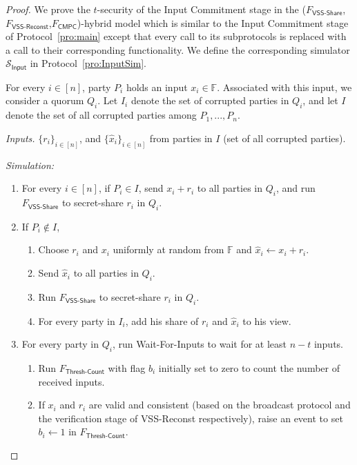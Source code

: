 \documentclass[11pt,letter]{article}
\newcommand{\alg}[1]{\mbox{\textsf{#1}}}
\newcommand{\func}[1]{\mbox{$F_\textsf{#1}$}}
\newcommand{\simu}[1]{\mbox{$\mathcal{S}_\textsf{#1}$}}
\newcommand{\mask}[1]{\widehat{#1}}
\newcommand{\F}{\mathbb{F}}
\theoremstyle{mytheoremstyle}
\let\savedCaption=\caption
\renewcommand*{\caption}[1]{\savedCaption[#1]{~#1}}
\newcommand{\algfont}{}
\begin{document}
\begin{proof}
	We prove the $t$-security of the Input Commitment stage in the (\func{VSS-Share}, \func{VSS-Reconst},\func{CMPC})-hybrid model which is similar to the Input Commitment stage of Protocol~\ref{pro:main} except that every call to its subprotocols is replaced with a call to their corresponding functionality. We define the corresponding simulator \simu{Input} in Protocol~\ref{pro:InputSim}.

	\begin{algorithm}
		\algfont
		\caption{\simu{Input}}
		\label{pro:InputSim}
		
		For every $i \in [n]$, party $P_i$ holds an input $x_i \in \F$. Associated with this input, we consider a quorum $Q_i$. Let $I_i$ denote the set of corrupted parties in $Q_i$, and let $I$ denote the set of all corrupted parties among $P_1,...,P_n$.\medskip
		
		\textit{Inputs.} $\{r_i\}_{i\in [n]}$, and $\{\mask{x}_i\} _{i \in [n]}$ from parties in $I$ (set of all corrupted parties). \medskip
		
		\textit{Simulation:}
		
		\begin{enumerate}
				\item For every $i \in [n]$, if $P_i \in I$, send $x_i + r_i$ to all parties in $Q_i$, and run \func{VSS-Share} to secret-share $r_i$ in $Q_i$.
				
				\item If $P_i \notin I$, 
					\begin{enumerate}
						\item Choose $r_i$ and $x_i$ uniformly at random from $\F$ and \mbox{$\mask{x}_i \gets x_i + r_i$}.
						\item Send $\mask{x}_i$ to all parties in $Q_i$.
						\item Run \func{VSS-Share} to secret-share $r_i$ in $Q_i$. 
						\item For every party in $I_i$, add his share of $r_i$ and $\mask{x}_i$ to his view.
					\end{enumerate}
			
				\item For every party in $Q_i$, run \alg{Wait-For-Inputs} to wait for at least $n-t$ inputs.
				\begin{enumerate}
					\item Run \func{Thresh-Count} with flag $b_i$ initially set to zero to count the number of received inputs.
					
					\item If $x_i$ and $r_i$ are valid and consistent (based on the broadcast protocol and the verification stage of \alg{VSS-Reconst} respectively), raise an event to set $b_i \gets 1$ in \func{Thresh-Count}.
					

\end{enumerate}
\end{enumerate}
\end{algorithm}
\end{proof}
\end{document}

